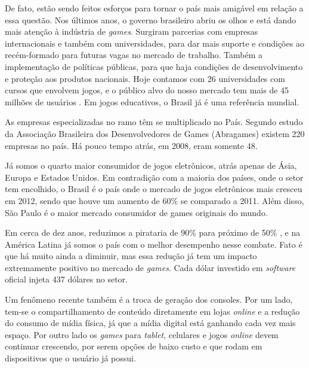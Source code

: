 De fato, estão sendo feitos esforços para tornar o país mais amigável em relação a essa questão. Nos últimos anos, o governo brasileiro abriu os olhos e está dando mais atenção à indústria de \textit{games}. Surgiram parcerias com empresas internacionais e também com universidades, para dar mais suporte e condições ao recém-formado para futuras vagas no mercado de trabalho. Também a implementação de políticas públicas, para que haja condições de desenvolvimento e proteção aos produtos nacionais. Hoje contamos com 26 universidades com cursos que envolvem jogos, e o público alvo do nosso mercado tem mais de 45 milhões de usuários \cite{GEDIGames}. Em jogos educativos, o Brasil já é uma referência mundial.

As empresas especializadas no ramo têm se multiplicado no País. Segundo estudo da Associação Brasileira dos Desenvolvedores de Games (Abragames) existem 220 empresas no país. Há pouco tempo atrás, em 2008, eram somente 48.

Já somos o quarto maior consumidor de jogos eletrônicos, atrás apenas de Ásia, Europa e Estados Unidos. Em contradição com a maioria dos países, onde o setor tem encolhido, o Brasil é o país onde o mercado de jogos eletrônicos mais cresceu em 2012, sendo que houve um aumento de 60\% se comparado a 2011. Além disso, São Paulo é o maior mercado consumidor de games originais do mundo.

Em cerca de dez anos, reduzimos a pirataria de 90\% para próximo de 50\% \cite{GEDIGames}, e na América Latina já somos o país com o melhor desempenho nesse combate. Fato é que há muito ainda a diminuir, mas essa redução já tem um impacto extremamente positivo no mercado de \textit{games}. Cada dólar investido em \textit{software} oficial injeta 437 dólares no setor.

Um fenômeno recente também é a troca de geração dos consoles. Por um lado, tem-se o compartilhamento de conteúdo diretamente em lojas \textit{online} e a redução do consumo de mídia física, já que a mídia digital está ganhando cada vez mais espaço. Por outro lado os \textit{games} para \textit{tablet}, celulares e jogos \textit{online} devem continuar crescendo, por serem opções de baixo custo e que rodam em dispositivos que o usuário já possui.


